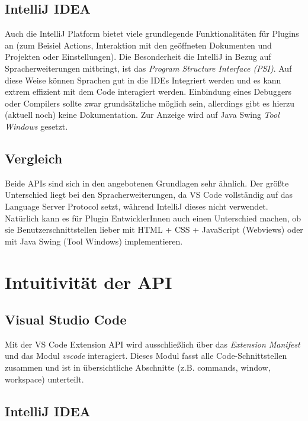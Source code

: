 \subsection{IntelliJ IDEA}

Auch die IntelliJ Platform bietet viele grundlegende Funktionalitäten
für Plugins an (zum Beisiel Actions, Interaktion mit den geöffneten Dokumenten
und Projekten oder Einstellungen). Die Besonderheit die IntelliJ
in Bezug auf Spracherweiterungen
mitbringt, ist das \emph{Program Structure Interface (PSI)}. 
Auf diese Weise können Sprachen gut in die IDEs Integriert werden
und es kann extrem effizient mit dem Code interagiert werden.
Einbindung eines Debuggers oder Compilers sollte zwar grundsätzliche
möglich sein, allerdings gibt es hierzu (aktuell noch) keine Dokumentation.
Zur Anzeige wird auf Java Swing \emph{Tool Windows} gesetzt.

\subsection{Vergleich}

Beide APIs sind sich in den angebotenen Grundlagen sehr ähnlich.
Der größte Unterschied liegt bei den Spracherweiterungen, da VS Code 
vollständig auf das Language Server Protocol setzt, während IntelliJ
dieses nicht verwendet. Natürlich kann es für Plugin EntwicklerInnen
auch einen Unterschied machen, ob sie Benutzerschnittstellen
lieber mit HTML + CSS + JavaScript (Webviews) oder
mit Java Swing (Tool Windows) implementieren. 


\section{Intuitivität der API}
\label{sec:Vergleich_Intuitivität}

\subsection{Visual Studio Code}

Mit der VS Code Extension API wird ausschließlich
über das \emph{Extension Manifest} und das Modul \emph{vscode} interagiert.
Dieses Modul fasst alle Code-Schnittstellen zusammen und ist
in übersichtliche Abschnitte (z.B. commands, window, workspace) unterteilt.

\subsection{IntelliJ IDEA}

